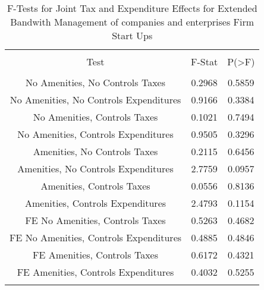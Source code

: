 
\begin{table}[!htbp] \centering 
  \caption{F-Tests for Joint Tax and Expenditure Effects for Extended Bandwith Management of companies and enterprises Firm Start Ups} 
  \label{55Ftests} 
\begin{tabular}{@{\extracolsep{5pt}} ccc} 
\\[-1.8ex]\hline 
\hline \\[-1.8ex] 
Test & F-Stat & P(\textgreater F) \\ 
\hline \\[-1.8ex] 
No Amenities, No Controls Taxes & 0.2968 & 0.5859 \\ 
No Amenities, No Controls Expenditures & 0.9166 & 0.3384 \\ 
No Amenities, Controls Taxes & 0.1021 & 0.7494 \\ 
No Amenities, Controls Expenditures & 0.9505 & 0.3296 \\ 
Amenities, No Controls Taxes & 0.2115 & 0.6456 \\ 
Amenities, No Controls Expenditures & 2.7759 & 0.0957 \\ 
Amenities, Controls Taxes & 0.0556 & 0.8136 \\ 
Amenities, Controls Expenditures & 2.4793 & 0.1154 \\ 
FE No Amenities, Controls Taxes & 0.5263 & 0.4682 \\ 
FE No Amenities, Controls Expenditures & 0.4885 & 0.4846 \\ 
FE Amenities, Controls Taxes & 0.6172 & 0.4321 \\ 
FE Amenities, Controls Expenditures & 0.4032 & 0.5255 \\ 
\hline \\[-1.8ex] 
\end{tabular} 
\end{table} 
